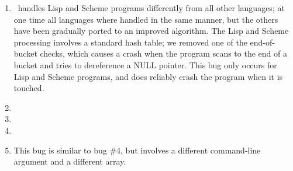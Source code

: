 \begin{enumerate}
\item \moss\ handles Lisp and Scheme programs differently from all other languages;
at one time all languages where handled in the same manner, but the others have been
gradually ported to an improved algorithm.  The Lisp and Scheme processing involves
a standard hash table; we removed one of the end-of-bucket checks, which causes a
crash when the program scans to the end of a bucket and tries to dereference a NULL
pointer.  This bug only occurs for Lisp and Scheme programs, and does reliably crash
the program when it is touched.

\item 

\item

\item 

\item This bug is similar to bug \#4, but involves a different command-line argument and a different array. 

\end{enumerate}





